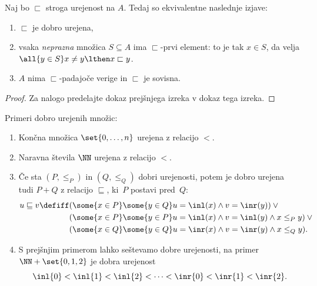 \begin{izrek}
  \label{izr:dobra-urejenost-karakterizacija}
  Naj bo $\sqsubset$ stroga urejenost na $A$. Tedaj so ekvivalentne naslednje izjave:
  \begin{enumerate}
  \item[(1)] $\sqsubset$ je dobro urejena,
  \item[(2)] vsaka \emph{neprazna} množica $S \subseteq A$ ima $\sqsubset$-prvi element: to je tak $x \in S$, da velja
    $\all{y \in S} x \neq y \lthen x \sqsubset y$.
  \item[(3)] $A$ nima $\sqsubset$-padajoče verige in $\sqsubset$ je sovisna.
  \end{enumerate}
\end{izrek}

\begin{proof}
  Za nalogo predelajte dokaz prejšnjega izreka v dokaz tega izreka.
\end{proof}

\begin{zgled}
  Primeri dobro urejenih množic:
  \begin{enumerate}
  \item Končna množica $\set{0, \ldots, n}$ urejena z relacijo $<$.

  \item Naravna števila $\NN$ urejena z relacijo $<$.

  \item Če sta $(P, \leq_P)$ in $(Q, \leq_Q)$ dobri urejenosti, potem je dobro urejena tudi $P + Q$ z relacijo
    $\sqsubseteq$, ki~$P$ postavi pred~$Q$:
    \begin{equation*}
      u \sqsubseteq v \defiff
      \begin{aligned}[t]
        &(\some{x \in P} \some{y \in Q} u = \inl(x) \land v = \inr(y)) \lor {}\\
        &(\some{x \in P} \some{y \in P} u = \inl(x) \land v = \inl(y) \land x \leq_P y) \lor {}\\
        &(\some{x \in Q} \some{y \in Q} u = \inr(x) \land v = \inr(y) \land x \leq_Q y).
      \end{aligned}
    \end{equation*}

  \item
    S prejšnjim primerom lahko seštevamo dobre urejenosti, na primer $\NN + \set{0, 1, 2}$ je dobra
    urejenost
    \begin{equation*}
      \inl{0} < \inl{1} < \inl{2} < \cdots < \inr{0} < \inr{1} < \inr{2}.
    \end{equation*}
  \end{enumerate}
\end{zgled}


